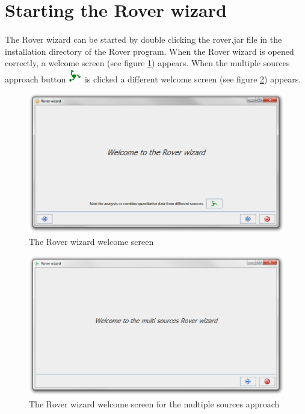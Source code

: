 \documentclass[11pt,a4paper,oneside,notitlepage]{book}
\begin{document}
\section{Starting the Rover wizard}

\paragraph{}The Rover wizard can be started by double clicking the rover.jar file in the installation directory of the Rover program. When the Rover wizard is opened correctly, a welcome screen (see figure \ref{welcome}) appears. When the multiple sources approach button \includegraphics[scale=0.6, H]{mutliRover.png} is clicked a different welcome screen (see figure \ref{welcome_M}) appears. 

\begin{figure}[H]
\begin{center}
\includegraphics[scale=0.4]{Rover_wizard_S.png}
\caption{The Rover wizard welcome screen}
\label{welcome}
\end{center}
\end{figure}

\begin{figure}[H]
\begin{center}
\includegraphics[scale=0.4]{Rover_wizard_M.png}
\caption{The Rover wizard welcome screen for the multiple sources approach}
\label{welcome_M}
\end{center}
\end{figure}
\end{document}
